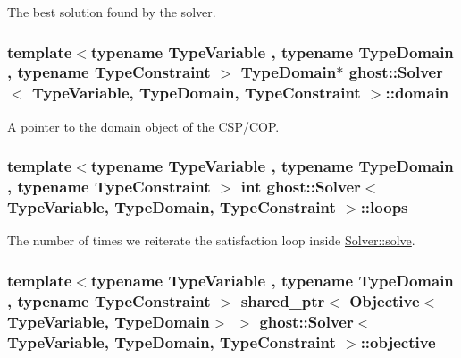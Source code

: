 The best solution found by the solver. 

\hypertarget{classghost_1_1Solver_ad9292e9219261ba8058fec05b453c0c9}{
\subsubsection[{domain}]{\setlength{\rightskip}{0pt plus 5cm}template$<$typename Type\-Variable , typename Type\-Domain , typename Type\-Constraint $>$ Type\-Domain$\ast$ {\bf ghost\-::\-Solver}$<$ Type\-Variable, Type\-Domain, Type\-Constraint $>$\-::domain\hspace{0.3cm}{\ttfamily [private]}}}\label{classghost_1_1Solver_ad9292e9219261ba8058fec05b453c0c9}


A pointer to the domain object of the C\-S\-P/\-C\-O\-P. 

\hypertarget{classghost_1_1Solver_aa6a77e14862a9be467e6c6c76124b526}{
\subsubsection[{loops}]{\setlength{\rightskip}{0pt plus 5cm}template$<$typename Type\-Variable , typename Type\-Domain , typename Type\-Constraint $>$ int {\bf ghost\-::\-Solver}$<$ Type\-Variable, Type\-Domain, Type\-Constraint $>$\-::loops\hspace{0.3cm}{\ttfamily [private]}}}\label{classghost_1_1Solver_aa6a77e14862a9be467e6c6c76124b526}


The number of times we reiterate the satisfaction loop inside \hyperlink{classghost_1_1Solver_a30dd2769fb30ac42d231d2c305dcdf13}{Solver\-::solve}. 

\hypertarget{classghost_1_1Solver_a4fd74bd68d0ea253fd35adad697f964d}{
\subsubsection[{objective}]{\setlength{\rightskip}{0pt plus 5cm}template$<$typename Type\-Variable , typename Type\-Domain , typename Type\-Constraint $>$ shared\-\_\-ptr$<$ {\bf Objective}$<$Type\-Variable, Type\-Domain$>$ $>$ {\bf ghost\-::\-Solver}$<$ Type\-Variable, Type\-Domain, Type\-Constraint $>$\-::objective\hspace{0.3cm}{\ttfamily [private]}}}\label{classghost_1_1Solver_a4fd74bd68d0ea253fd35adad697f964d}


